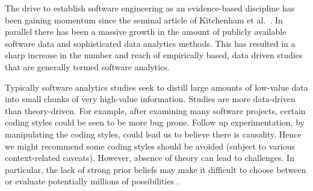 \documentclass[10pt]{elsarticle}
\newcommand{\RED}{\color{black}}
\newcommand{\BLACK}{\color{black}}
\begin{document}
\noindent
The drive to establish software engineering as an evidence-based discipline has been gaining momentum since the seminal article of Kitchenham et al.~\cite{Kitc04}.  In parallel there has been a massive growth in the amount of publicly available software data and sophisticated data analytics methods.  This has resulted in a sharp increase in the number and reach of empirically based, data driven studies that are generally termed software analytics.

Typically software analytics studies seek to distill large amounts of low-value data into small chunks of very high-value information. Studies are more data-driven than theory-driven.  For example, after examining many software projects, certain coding styles could be seen to be more bug prone.  Follow up experimentation, by manipulating the coding styles, could lead us to believe there is causality. Hence we might recommend some coding styles should be avoided (subject to various context-related caveats). \RED However, absence of theory can lead to challenges.  In particular, the lack of strong prior beliefs may make it difficult to choose between or evaluate potentially millions of possibilities \cite{Gust93,Deva16}.  \BLACK



\end{document}
